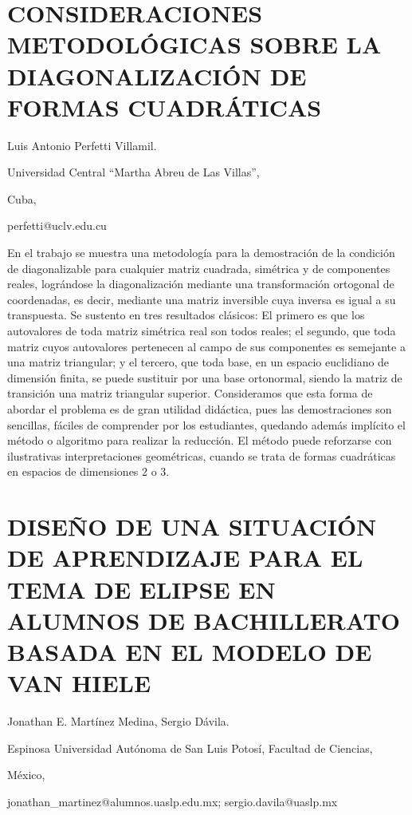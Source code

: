 \section{CONSIDERACIONES METODOLÓGICAS SOBRE LA DIAGONALIZACIÓN DE FORMAS
CUADRÁTICAS}

\begin{datos}

Luis Antonio Perfetti Villamil. 

Universidad Central “Martha Abreu de Las Villas”,

Cuba,

perfetti@uclv.edu.cu

\end{datos}

En el trabajo se muestra una metodología para la demostración de la
condición de diagonalizable para cualquier matriz cuadrada, simétrica
y de componentes reales, lográndose la diagonalización mediante una
transformación ortogonal de coordenadas, es decir, mediante una matriz
inversible cuya inversa es igual a su transpuesta. Se sustento en
tres resultados clásicos: El primero es que los autovalores de toda
matriz simétrica real son todos reales; el segundo, que toda matriz
cuyos autovalores pertenecen al campo de sus componentes es semejante
a una matriz triangular; y el tercero, que toda base, en un espacio
euclidiano de dimensión finita, se puede sustituir por una base ortonormal,
siendo la matriz de transición una matriz triangular superior. Consideramos
que esta forma de abordar el problema es de gran utilidad didáctica,
pues las demostraciones son sencillas, fáciles de comprender por los
estudiantes, quedando además implícito el método o algoritmo para
realizar la reducción. El método puede reforzarse con ilustrativas
interpretaciones geométricas, cuando se trata de formas cuadráticas
en espacios de dimensiones 2 o 3.


\section{DISEÑO DE UNA SITUACIÓN DE APRENDIZAJE PARA EL TEMA DE ELIPSE EN
ALUMNOS DE BACHILLERATO BASADA EN EL MODELO DE VAN HIELE}

\begin{datos}

Jonathan E. Martínez Medina, Sergio Dávila.

Espinosa Universidad Autónoma de San Luis Potosí, Facultad de Ciencias,

México,

jonathan\_martinez@alumnos.uaslp.edu.mx; sergio.davila@uaslp.mx 

\end{datos}

